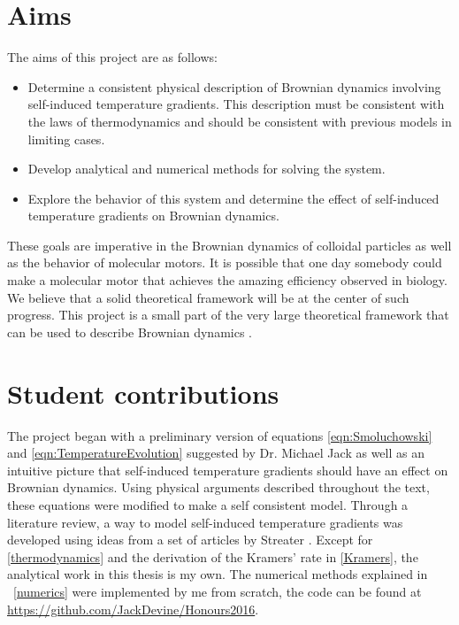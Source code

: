 \section{Aims}
The aims of this project are as follows:
\begin{itemize}
\item{Determine a consistent physical description of Brownian dynamics involving self-induced temperature gradients. This description must be consistent with the laws of thermodynamics and should be consistent with previous models in limiting cases.}
\item{Develop analytical and numerical methods for solving the system.}
\item{Explore the behavior of this system and determine the effect of self-induced temperature gradients on Brownian dynamics.}
\end{itemize}
These goals are imperative in the Brownian dynamics of colloidal particles as well as the behavior of molecular motors. It is possible that one day somebody could make a molecular motor that achieves the amazing efficiency observed in biology. We believe that a solid theoretical framework will be at the center of such progress. This project is a small part of the very large theoretical framework that can be used to describe Brownian dynamics \cite{Astumian2007,KellerBustamante2000,leibler1990physical,Leibler1993}.
\section{Student contributions}
The project began with a preliminary version of equations \ref{eqn:Smoluchowski} and \ref{eqn:TemperatureEvolution} suggested by Dr. Michael Jack as well as an intuitive picture that self-induced temperature gradients should have an effect on Brownian dynamics. Using physical arguments described throughout the text, these equations were modified to make a self consistent model. Through a literature review, a way to model self-induced temperature gradients was developed using ideas from a set of articles by Streater \cite{Streater1997, Streater1997a,Streater2000,Streater1997b}. Except for \autoref{thermodynamics} and the derivation of the Kramers' rate in \autoref{Kramers}, the analytical work in this thesis is my own. The numerical methods explained in ~\autoref{numerics} were implemented by me from scratch, the code can be found at \href{url}{https://github.com/JackDevine/Honours2016}.
